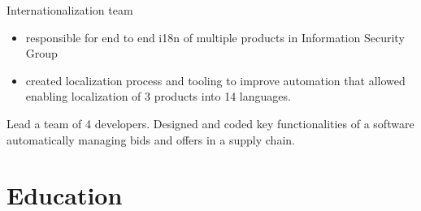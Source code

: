 \documentclass[11pt,a4paper,roman]{moderncv}       %
\begin{document}
Internationalization team

\begin{itemize}
    \item responsible for end to end i18n of multiple products in Information Security Group
    \item created localization process and tooling to improve automation that allowed enabling localization of 3 products into 14 languages.
\end{itemize}

\vspace{16pt}


Lead a team of 4 developers. Designed and coded key functionalities of a software automatically managing bids and offers in a supply chain.


\section{Education}

\vspace{5pt}









\end{document}
